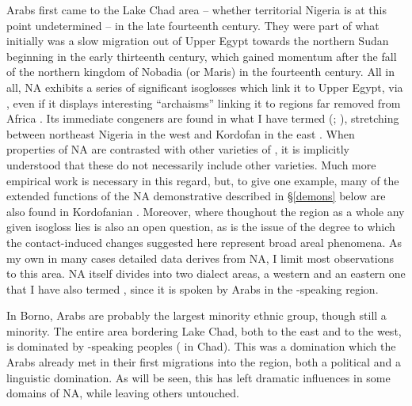 \documentclass[output=paper]{langsci/langscibook}
\begin{document}
Arabs first came to the {Lake Chad} area – whether territorial Nigeria is at this point undetermined – in the late fourteenth century. They were part of what initially was a slow migration out of Upper Egypt towards the northern Sudan beginning in the early thirteenth century, which gained momentum after the fall of the northern  kingdom of Nobadia (or Maris) in the fourteenth century. All in all, NA exhibits a series of significant isoglosses which link it to Upper Egypt, via  , even if it displays interesting “archaisms” linking it to regions far removed from Africa \citep{Owens2013}. Its immediate congeners are found in what I have termed    (; \citealt{Owens1994editor,Owens1994author}), stretching between northeast Nigeria in the west and Kordofan in the east \citep{Manfredi2010}. When properties of NA are contrasted with other varieties of , it is implicitly understood that these do not necessarily include other  varieties. Much more empirical work is necessary in this regard, but, to give one example, many of the extended functions of the NA demonstrative described in §\ref{demons} below are also found in Kordofanian  \citep{Manfredi2014demonstratives}. Moreover, where thoughout the  region as a whole any given isogloss lies is also an open question, as is the issue of the degree to which the contact-induced changes suggested here represent broad areal phenomena. As my own in many cases detailed data derives from NA, I limit most observations to this area. NA itself divides into two dialect areas, a western and an eastern one that I have also termed  , since it is spoken by Arabs in the -speaking region.

In {Borno}, Arabs are probably the largest minority ethnic group, though still a minority. The entire area bordering {Lake Chad}, both to the east and to the west, is dominated by -speaking peoples ( in Chad). This was a domination which the Arabs already met in their first migrations into the region, both a political and a linguistic domination. As will be seen, this has left dramatic influences in some domains of NA, while leaving others untouched.
\end{document}
